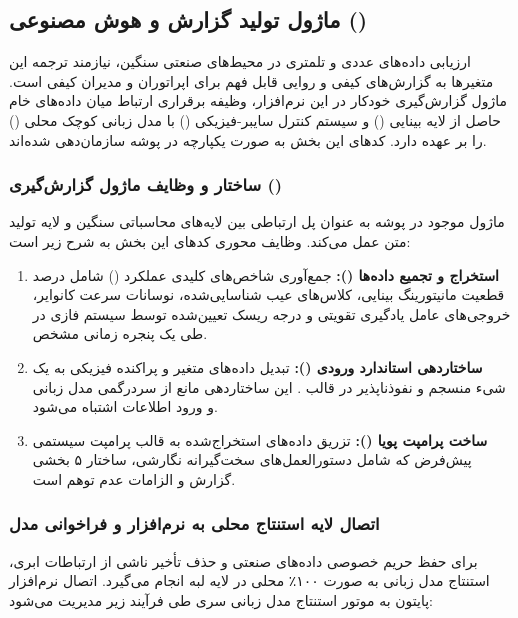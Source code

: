 \documentclass[a4paper, 10pt, twocolumn]{article}
\begin{document}
	\subsection{ماژول تولید گزارش و هوش مصنوعی ()}
	
	ارزیابی داده‌های عددی و تلمتری در محیط‌های صنعتی سنگین، نیازمند ترجمه این متغیرها به گزارش‌های کیفی و روایی قابل فهم برای اپراتوران و مدیران کیفی است. ماژول گزارش‌گیری خودکار در این نرم‌افزار، وظیفه برقراری ارتباط میان داده‌های خام حاصل از لایه بینایی () و سیستم کنترل سایبر-فیزیکی () با مدل زبانی کوچک محلی () را بر عهده دارد. کدهای این بخش به صورت یکپارچه در پوشه  سازمان‌دهی شده‌اند.
	
	\subsubsection{ساختار و وظایف ماژول گزارش‌گیری ()}
	ماژول موجود در پوشه  به عنوان پل ارتباطی بین لایه‌های محاسباتی سنگین و لایه تولید متن عمل می‌کند. وظایف محوری کدهای این بخش به شرح زیر است:
	
	\begin{enumerate}
		\item \textbf{استخراج و تجمیع داده‌ها ():} جمع‌آوری شاخص‌های کلیدی عملکرد () شامل درصد قطعیت مانیتورینگ بینایی، کلاس‌های عیب شناسایی‌شده، نوسانات سرعت کانوایر، خروجی‌های عامل یادگیری تقویتی و درجه ریسک تعیین‌شده توسط سیستم فازی در طی یک پنجره زمانی مشخص.
		\item \textbf{ساختاردهی استاندارد ورودی ():} تبدیل داده‌های متغیر و پراکنده فیزیکی به یک شیء منسجم و نفوذناپذیر در قالب . این ساختاردهی مانع از سردرگمی مدل زبانی و ورود اطلاعات اشتباه می‌شود.
		\item \textbf{ساخت پرامپت پویا ():} تزریق داده‌های  استخراج‌شده به قالب پرامپت سیستمی پیش‌فرض که شامل دستورالعمل‌های سخت‌گیرانه نگارشی، ساختار ۵ بخشی گزارش و الزامات عدم توهم است.
	\end{enumerate}
	
	\subsubsection{اتصال لایه استنتاج محلی به نرم‌افزار و فراخوانی مدل }
	برای حفظ حریم خصوصی داده‌های صنعتی و حذف تأخیر ناشی از ارتباطات ابری، استنتاج مدل زبانی به صورت ۱۰۰٪ محلی در لایه لبه انجام می‌گیرد. اتصال نرم‌افزار پایتون به موتور استنتاج مدل زبانی سری  طی فرآیند زیر مدیریت می‌شود:
	
\end{document}
